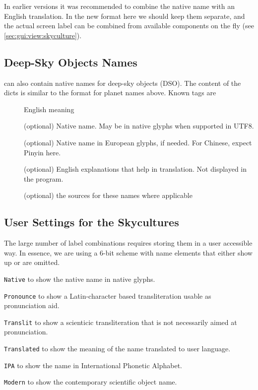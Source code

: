 In earlier versions it was recommended to combine the native name with an English translation. 
In the new format here we should keep them separate, and the actual screen label can be combined from available 
components on the fly (see \ref{sec:gui:view:skyculture}).



\subsection{Deep-Sky Objects Names}
\label{sec:skycultures:dsonames}

 can also contain native names for
deep-sky objects (DSO). The content  of the dicts is similar to the 
format for planet names above. %
Known tags are 
\begin{description}
\item[] English meaning
\item[] (optional) Native name. May be in native glyphs when supported in UTF8.
\item[] (optional) Native name in European glyphs, if needed. For Chinese, expect Pinyin here.
\item[] (optional) English explanations that help in translation. Not displayed in the program.
\item[]  (optional) the sources for these names where applicable
\end{description}

\subsection{User Settings for the Skycultures}
\label{SC:settings}

The large number of label combinations requires storing them in a user accessible way. In essence, we are using a 6-bit scheme with name elements that either show up or are omitted.
\begin{description}
\item{\texttt{Native}} to show the native name in native glyphs.
\item{\texttt{Pronounce}} to show a Latin-character based transliteration usable as pronunciation aid.
\item{\texttt{Translit}} to show a scienticic transliteration that is not necessarily aimed at pronunciation.
\item{\texttt{Translated}} to show the meaning of the name translated to user language. 
\item{\texttt{IPA}} to show the name in International Phonetic Alphabet.
\item{\texttt{Modern}} to show the contemporary scientific object name.
\end{description}

